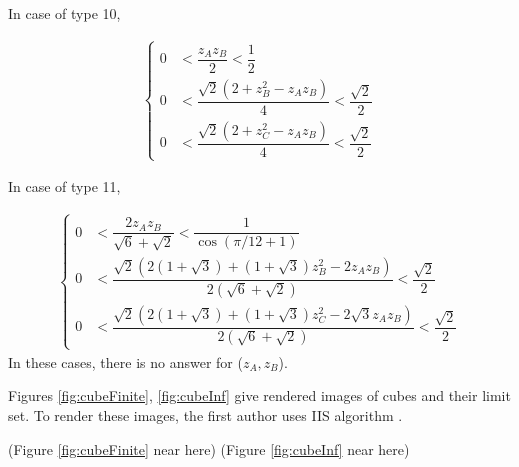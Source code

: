 \documentclass[suppldata, dvipdfmx]{interact}
\theoremstyle{plain}%
\theoremstyle{definition}
\theoremstyle{remark}
\theoremstyle{problemstyle}
\begin{document}
In case of type 10,

\begin{align*}
 \begin{cases}
  0 &< \dfrac{z_Az_B}{2} < \dfrac{1}{2}\\
  0 &< \dfrac{\sqrt{2}(2 + z^2_B - z_A z_B)}{4} < \dfrac{\sqrt{2}}{2}\\
  0 &< \dfrac{\sqrt{2}(2 + z^2_C - z_A z_B)}{4} < \dfrac{\sqrt{2}}{2}
 \end{cases}
\end{align*}

In case of type 11,

\begin{align*}
 \begin{cases}
  0 &< \dfrac{2z_Az_B}{\sqrt{6} + \sqrt{2}} < \dfrac{1}{\cos(\pi/12+1)}\\
  0 &< \dfrac{\sqrt{2}(2 (1 + \sqrt{3}) + (1 + \sqrt{3})z^2_B -2z_Az_B)}
  {2(\sqrt{6} + \sqrt{2})} < \dfrac{\sqrt{2}}{2}\\
  0 &< \dfrac{\sqrt{2}(2 (1 + \sqrt{3}) + (1 + \sqrt{3})z^2_C
  -2\sqrt{3}z_Az_B)}
  {2(\sqrt{6} + \sqrt{2})} < \dfrac{\sqrt{2}}{2}
 \end{cases}
\end{align*}
In these cases, there is no answer for ($z_A, z_B$).

Figures \ref{fig:cubeFinite}, \ref{fig:cubeInf} give rendered images of cubes and their limit set.  To render these images, the first author uses IIS algorithm \cite{bridges2018}.

\noindent(Figure \ref{fig:cubeFinite}
 near here)
(Figure \ref{fig:cubeInf}
 near here)
\end{document}
